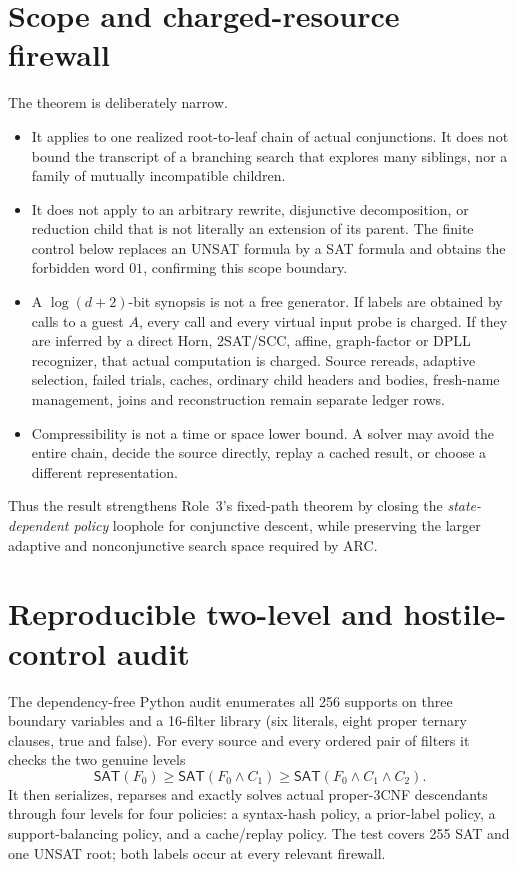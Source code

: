 \documentclass[11pt]{article}
\newcommand{\SAT}{\mathsf{SAT}}
\begin{document}
\section{Scope and charged-resource firewall}
The theorem is deliberately narrow.
\begin{itemize}
\item It applies to one realized root-to-leaf chain of actual conjunctions.
It does not bound the transcript of a branching search that explores many
siblings, nor a family of mutually incompatible children.
\item It does not apply to an arbitrary rewrite, disjunctive decomposition,
or reduction child that is not literally an extension of its parent.  The
finite control below replaces an UNSAT formula by a SAT formula and obtains
the forbidden word $01$, confirming this scope boundary.
\item A $\log(d+2)$-bit synopsis is not a free generator.  If labels are
obtained by calls to a guest $A$, every call and every virtual input probe is
charged.  If they are inferred by a direct Horn, 2SAT/SCC, affine, graph-factor
or DPLL recognizer, that actual computation is charged.  Source rereads,
adaptive selection, failed trials, caches, ordinary child headers and bodies,
fresh-name management, joins and reconstruction remain separate ledger rows.
\item Compressibility is not a time or space lower bound.  A solver may avoid
the entire chain, decide the source directly, replay a cached result, or choose
a different representation.
\end{itemize}
Thus the result strengthens Role~3's fixed-path theorem by closing the
\emph{state-dependent policy} loophole for conjunctive descent, while
preserving the larger adaptive and nonconjunctive search space required by ARC.

\section{Reproducible two-level and hostile-control audit}
The dependency-free Python audit enumerates all 256 supports on three boundary
variables and a 16-filter library (six literals, eight proper ternary clauses,
true and false).  For every source and every ordered pair of filters it checks
the two genuine levels
\[
 \SAT(F_0)\ge\SAT(F_0\wedge C_1)
 \ge\SAT(F_0\wedge C_1\wedge C_2).
\]
It then serializes, reparses and exactly solves actual proper-3CNF descendants
through four levels for four policies: a syntax-hash policy, a prior-label
policy, a support-balancing policy, and a cache/replay policy.  The test covers
255 SAT and one UNSAT root; both labels occur at every relevant firewall.
\end{document}
